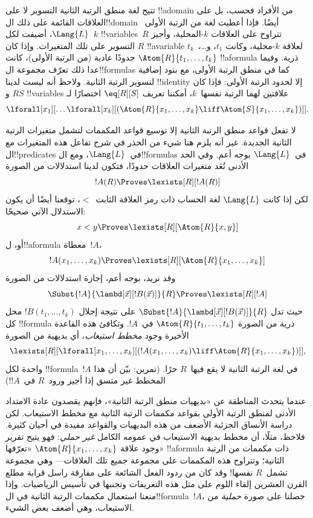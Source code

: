 \documentclass[../../../include/open-logic-section]{subfiles}
\begin{document}


تتيح لغة منطق الرتبة الثانية التسوير لا على !!a{domain} من الأفراد
فحسب، بل على العلاقات القائمة على ذلك ال!!{domain} أيضًا. فإذا أعطيت
لغة من الرتبة الأولى~$\Lang{L}$، أضيفت لكل~$k$ !!{variable}s~$R$
تتراوح على العلاقات $k$-المحلية، وأجيز التسوير على تلك المتغيرات. وإذا
كان $R$ !!a{variable} لعلاقة $k$-محلية، وكانت $t_1$، و\dots،~$t_k$
حدودًا عادية (من الرتبة الأولى)، كانت $\Atom{R}{t_1,\dots,t_k}$
!!a{formula} ذرية. وفيما عدا ذلك تعرّف مجموعة ال!!{formula}s كما في
منطق الرتبة الأولى، مع بنود إضافية لتسوير الرتبة الثانية. ولاحظ أنه
ليست لدينا !!{identity} إلا لحدود الرتبة الأولى: فإذا كان $R$ و$S$
!!{variable}s علاقتين لهما الرتبة نفسها~$k$، أمكننا تعريف
$\eq[R][S]$ اختصارًا لـ
\[
\lforall[x_1][\dots\lforall[x_k][(\Atom{R}{x_1, \dots, x_k} \liff
  \Atom{S}{x_1, \dots, x_k})]].
\]

لا تفعل قواعد منطق الرتبة الثانية إلا توسيع قواعد المكممات لتشمل
متغيرات الرتبة الثانية الجديدة. غير أنه يلزم هنا شيء من الحذر في شرح
تفاعل هذه المتغيرات مع ال!!{predicate}s في~$\Lang{L}$، ومع
ال!!{formula}s في~$\Lang{L}$ بوجه أعم. وفي الحد الأدنى تُعَد متغيرات
العلاقات حدودًا، فتكون لدينا استدلالات من الصورة
\[
!A(R) \Proves \lexists[R][!A(R)]
\]
لكن إذا كانت $\Lang{L}$ لغة الحساب ذات رمز العلاقة الثابت~$<$، توقعنا
أيضًا أن يكون الاستدلال الآتي صحيحًا:
\[
x < y \Proves \lexists[R][\Atom{R}{x,y}]
\]
أو، ل!!a{formula} معطاة~$!A$،
\[
!A(x_1, \dots, x_k) \Proves \lexists[R][\Atom{R}{x_1,\dots,x_k}]
\]
وقد نريد، بوجه أعم، إجازة استدلالات من الصورة
\[
\Subst{!A}{\lambd[\vec x][!B(\vec x)]}{R} \Proves
\lexists[R][!A]
\]
حيث تدل $\Subst{!A}{\lambd[\vec x][!B(\vec x)]}{R}$ على نتيجة إحلال
$!B(t_1, \dots, t_k)$ محل كل !!{formula} ذرية من الصورة
$\Atom{R}{t_1,\dots,t_k}$ في~$!A$. وتكافئ هذه القاعدة الأخيرة وجود
{\em مخطط استيعاب}، أي بديهية من الصورة
\[
\lexists[R][\lforall[x_1, \dots, x_k][(!A(x_1, \dots, x_k) \liff
\Atom{R}{x_1, \dots, x_k})]],
\]
واحدة لكل !!{formula}~$!A$ في لغة الرتبة الثانية لا يقع فيها~$R$
حرًا. (تمرين: بيّن أن هذا المخطط غير متسق إذا أجيز ورود~$R$ في~$!A$!)

عندما يتحدث المناطقة عن «بديهيات منطق الرتبة الثانية»، فإنهم يقصدون
عادة الامتداد الأدنى لمنطق الرتبة الأولى بقواعد مكممات الرتبة الثانية
مع مخطط الاستيعاب. لكن دراسة الأنساق الجزئية الأضعف من هذه البديهيات
والقواعد مفيدة في أحيان كثيرة. فلاحظ، مثلًا، أن مخطط بديهية الاستيعاب
في عمومه الكامل \emph{غير حملي}: فهو يتيح تقرير وجود علاقة
$\Atom{R}{x_1, \dots, x_k}$ «تعرّفها» !!a{formula} ذات مكممات من
الرتبة الثانية؛ وتتراوح هذه المكممات على مجموعة جميع تلك العلاقات---
وهي مجموعة تشمل~$R$ نفسها!{} وقد كان من ردود الفعل الشائعة على مفارقة
راسل قرابة مطلع القرن العشرين إلقاء اللوم على مثل هذه التعريفات
وتجنبها في تأسيس الرياضيات. وإذا منعنا استعمال مكممات الرتبة الثانية
في ال!!{formula}~$!A$، حصلنا على صورة {\em حملية} من الاستيعاب، وهي
أضعف بعض الشيء.
\end{document}
